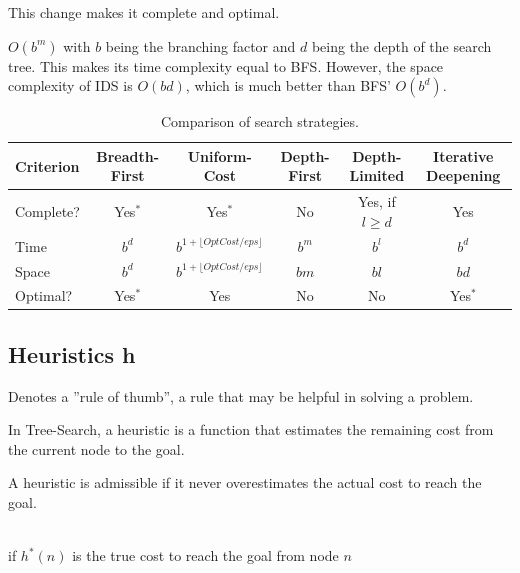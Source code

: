 \documentclass[
../../EiKI_Summary.tex,
]
{subfiles}
\begin{document}
This change makes it complete and optimal. 

 $O(b^m)$ with $b$ being the branching factor and $d$ being the depth of the search tree. This makes its time complexity equal to BFS. However, the space complexity of IDS is $O(bd)$, which is much better than BFS' $O(b^d)$.

\begin{table}[h!]
    \centering
    \begin{tabular}{@{}lccccc@{}}
    \toprule
    Criterion          & Breadth-First & Uniform-Cost & Depth-First & Depth-Limited & Iterative Deepening \\ \midrule
    Complete?          & Yes$^*$       & Yes$^*$      & No          & Yes, if $l \geq d$ & Yes                 \\
    Time               & $b^{d}$     & $b^{1 + \lfloor OptCost / eps \rfloor}$ & $b^m$       & $b^l$          & $b^d$              \\
    Space              & $b^{d}$     & $b^{1 + \lfloor OptCost / eps \rfloor}$ & $bm$        & $bl$           & $bd$               \\
    Optimal?           & Yes$^*$       & Yes          & No          & No            & Yes$^*$          \\ \bottomrule
    \end{tabular}
    \caption{Comparison of search strategies.}
\end{table}

\newpage
\subsection{Heuristics h}
\begin{defbox*}
    Denotes a ''rule of thumb'', a rule that may be helpful in solving a problem.

    In Tree-Search, a heuristic is a function that estimates the remaining cost from the current node to the goal.

\end{defbox*}

\begin{defbox}
    A heuristic is admissible if it never overestimates the actual cost to reach the goal.
    
    \begin{center}
        \\
        if $h^*(n)$ is the true cost to reach the goal from node $n$
    \end{center}
\end{defbox}
\end{document}

